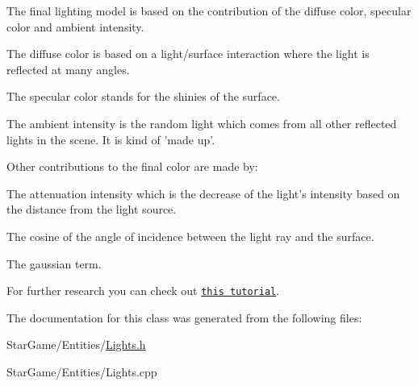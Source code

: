 The final lighting model is based on the contribution of the {\ttfamily diffuse color}, {\ttfamily specular color} and {\ttfamily ambient intensity}.
\begin{DoxyItemize}
\item The {\ttfamily diffuse color} is based on a light/surface interaction where the light is reflected at many angles.
\item The {\ttfamily specular color} stands for the shinies of the surface.
\item The {\ttfamily ambient intensity} is the random light which comes from all other reflected lights in the scene. It is kind of 'made up'.
\end{DoxyItemize}

Other contributions to the final color are made by\-:
\begin{DoxyItemize}
\item The {\ttfamily attenuation intensity} which is the decrease of the light's intensity based on the distance from the light source.
\item The cosine of the angle of incidence between the light ray and the surface.
\item The {\ttfamily gaussian term}.
\end{DoxyItemize}

For further research you can check out \href{http://www.arcsynthesis.org/gltut/Illumination/Illumination.html}{\tt this tutorial}. 

The documentation for this class was generated from the following files\-:\begin{DoxyCompactItemize}
\item 
Star\-Game/\-Entities/\hyperlink{_lights_8h}{Lights.\-h}\item 
Star\-Game/\-Entities/Lights.\-cpp\end{DoxyCompactItemize}

